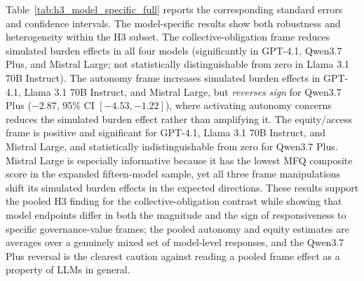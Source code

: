 Table~\ref{tab:h3_model_specific_full} reports the corresponding standard errors and confidence intervals. The model-specific results show both robustness and heterogeneity within the H3 subset. The collective-obligation frame reduces simulated burden effects in all four models (significantly in GPT-4.1, Qwen3.7 Plus, and Mistral Large; not statistically distinguishable from zero in Llama 3.1 70B Instruct). The autonomy frame increases simulated burden effects in GPT-4.1, Llama 3.1 70B Instruct, and Mistral Large, but \emph{reverses sign} for Qwen3.7 Plus ($-2.87$, 95\% CI $[-4.53, -1.22]$), where activating autonomy concerns reduces the simulated burden effect rather than amplifying it. The equity/access frame is positive and significant for GPT-4.1, Llama 3.1 70B Instruct, and Mistral Large, and statistically indistinguishable from zero for Qwen3.7 Plus. Mistral Large is especially informative because it has the lowest MFQ composite score in the expanded fifteen-model sample, yet all three frame manipulations shift its simulated burden effects in the expected directions. These results support the pooled H3 finding for the collective-obligation contrast while showing that model endpoints differ in both the magnitude and the sign of responsiveness to specific governance-value frames; the pooled autonomy and equity estimates are averages over a genuinely mixed set of model-level responses, and the Qwen3.7 Plus reversal is the clearest caution against reading a pooled frame effect as a property of LLMs in general.

